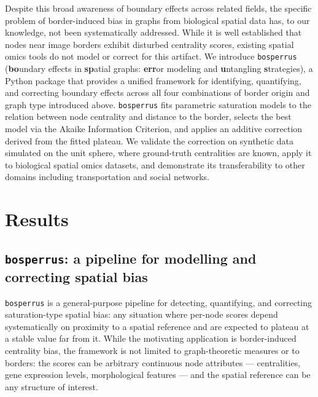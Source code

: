 \documentclass[fleqn,10pt]{olplainarticle}
\begin{document}
Despite this broad awareness of boundary effects across related fields, the specific problem of border-induced bias in graphs from biological spatial data has, to our knowledge, not been systematically addressed. While it is well established that nodes near image borders exhibit disturbed centrality scores, existing spatial omics tools do not model or correct for this artifact. We introduce \texttt{bosperrus} (\textbf{bo}undary effects in \textbf{sp}atial graphs: \textbf{err}or modeling and \textbf{u}ntangling \textbf{s}trategies), a Python package that provides a unified framework for identifying, quantifying, and correcting boundary effects across all four combinations of border origin and graph type introduced above. \texttt{bosperrus} fits parametric saturation models to the relation between node centrality and distance to the border, selects the best model via the Akaike Information Criterion, and applies an additive correction derived from the fitted plateau. We validate the correction on synthetic data simulated on the unit sphere, where ground-truth centralities are known, apply it to biological spatial omics datasets, and demonstrate its transferability to other domains including transportation and social networks.


\section*{Results}
\subsection*{\texttt{bosperrus}: a pipeline for modelling and correcting spatial bias}

\texttt{bosperrus} is a general-purpose pipeline for detecting, quantifying, and correcting saturation-type spatial bias: any situation where per-node scores depend systematically on proximity to a spatial reference and are expected to plateau at a stable value far from it.
While the motivating application is border-induced centrality bias, the framework is not limited to graph-theoretic measures or to borders: the scores can be arbitrary continuous node attributes — centralities, gene expression levels, morphological features — and the spatial reference can be any structure of interest.
\end{document}
